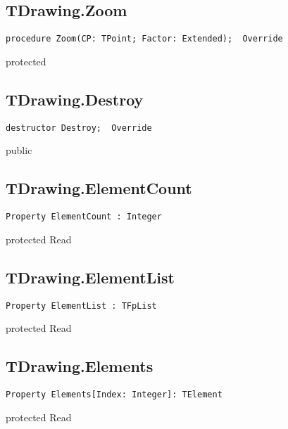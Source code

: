 \subsection{TDrawing.Zoom}
\label{hmi:drawncontrol:tdrawing:zoom}
\begin{FPCList}
\Declaration 

\begin{verbatim}
procedure Zoom(CP: TPoint; Factor: Extended);  Override
\end{verbatim}
\Visibility
protected
\end{FPCList}
\subsection{TDrawing.Destroy}
\label{hmi:drawncontrol:tdrawing:destroy}
\begin{FPCList}
\Declaration 

\begin{verbatim}
destructor Destroy;  Override
\end{verbatim}
\Visibility
public
\end{FPCList}
\subsection{TDrawing.ElementCount}
\label{hmi:drawncontrol:tdrawing:elementcount}
\begin{FPCList}
\Declaration 

\begin{verbatim}
Property ElementCount : Integer
\end{verbatim}
\Visibility
protected
\Access
Read
\end{FPCList}
\subsection{TDrawing.ElementList}
\label{hmi:drawncontrol:tdrawing:elementlist}
\begin{FPCList}
\Declaration 

\begin{verbatim}
Property ElementList : TFpList
\end{verbatim}
\Visibility
protected
\Access
Read
\end{FPCList}
\subsection{TDrawing.Elements}
\label{hmi:drawncontrol:tdrawing:elements}
\begin{FPCList}
\Declaration 

\begin{verbatim}
Property Elements[Index: Integer]: TElement
\end{verbatim}
\Visibility
protected
\Access
Read
\end{FPCList}
